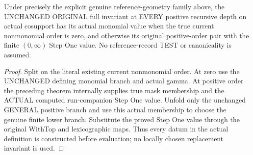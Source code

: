 \begin{theorem}
\label{hir:original-modeled-untested-curve-full-value}
\leanok
Under precisely the explicit genuine reference-geometry family above, the
UNCHANGED ORIGINAL full invariant at EVERY positive recursive depth on actual
cosupport has its actual monomial value when the true current nonmonomial order
is zero, and otherwise its original positive-order pair with the finite
$(0,\infty)$ Step One value. No reference-record TEST or canonicality is assumed.
\end{theorem}
\begin{proof}
Split on the literal existing current nonmonomial order. At zero use the
UNCHANGED defining monomial branch and actual gamma. At positive order the
preceding theorem internally supplies true mask membership and the ACTUAL
computed run-companion Step One value. Unfold only the unchanged GENERAL
positive branch and use this actual membership to choose the genuine finite
lower branch. Substitute the proved Step One value through the original
WithTop and lexicographic maps. Thus every datum in the actual definition is
constructed before evaluation; no locally chosen replacement invariant is used.
\end{proof}

